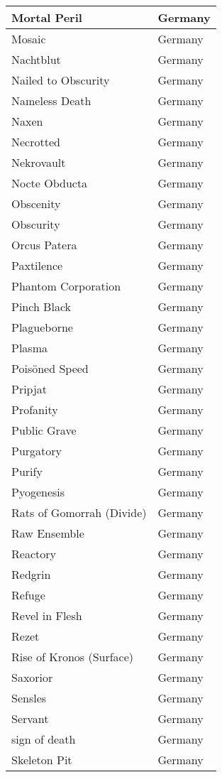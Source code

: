 \documentclass[12pt, a4paper, twoside]{report}
\begin{document}
\begin{center}
\begin{longtable}{|p{5cm}|p{5cm}|}
Mortal Peril & Germany \\ \hline
Mosaic & Germany \\ \hline
Nachtblut & Germany \\ \hline
Nailed to Obscurity & Germany \\ \hline
Nameless Death & Germany \\ \hline
Naxen & Germany \\ \hline
Necrotted & Germany \\ \hline
Nekrovault & Germany \\ \hline
Nocte Obducta & Germany \\ \hline
Obscenity & Germany \\ \hline
Obscurity & Germany \\ \hline
Orcus Patera & Germany \\ \hline
Paxtilence & Germany \\ \hline
Phantom Corporation & Germany \\ \hline
Pinch Black & Germany \\ \hline
Plagueborne & Germany \\ \hline
Plasma & Germany \\ \hline
Poisöned Speed & Germany \\ \hline
Pripjat & Germany \\ \hline
Profanity & Germany \\ \hline
Public Grave & Germany \\ \hline
Purgatory & Germany \\ \hline
Purify & Germany \\ \hline
Pyogenesis & Germany \\ \hline
Rats of Gomorrah (Divide) & Germany \\ \hline
Raw Ensemble & Germany \\ \hline
Reactory & Germany \\ \hline
Redgrin & Germany \\ \hline
Refuge & Germany \\ \hline
Revel in Flesh & Germany \\ \hline
Rezet & Germany \\ \hline
Rise of Kronos (Surface) & Germany \\ \hline
Saxorior & Germany \\ \hline
Sensles & Germany \\ \hline
Servant & Germany \\ \hline
sign of death & Germany \\ \hline
Skeleton Pit & Germany \\ \hline

\end{longtable}
\end{center}
\end{document}
